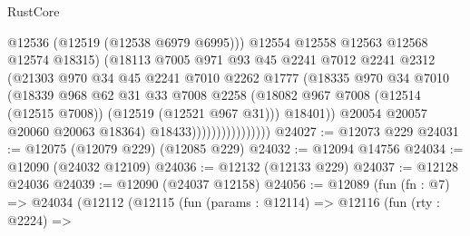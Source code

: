 \begin{lexlean}{RustCore}
\begin{coremodule}
                                      @12536
                                      (@12519 (@12538 @6979 @6995)))
                                    @12554
                                    @12558
                                    @12563
                                    @12568
                                    @12574
                                    @18315)
                                  (@18113
                                    @7005
                                    @971
                                    @93
                                    @45
                                    @2241
                                    @7012
                                    @2241
                                    @2312
                                    (@21303
                                      @970
                                      @34
                                      @45
                                      @2241
                                      @7010
                                      @2262
                                      @1777
                                      (@18335
                                        @970
                                        @34
                                        @7010
                                        (@18339
                                          @968
                                          @62
                                          @31
                                          @33
                                          @7008
                                          @2258
                                          (@18082
                                            @967
                                            @7008
                                            (@12514 (@12515 @7008))
                                            (@12519 (@12521 @967 @31)))
                                          @18401))
                                      @20054
                                      @20057
                                      @20060
                                      @20063
                                      @18364)
                                    @18433))))))))))))))))
@24027 := @12073 @229
@24031 := @12075 (@12079 @229) (@12085 @229)
@24032 := @12094 @14756
@24034 := @12090 (@24032 @12109)
@24036 := @12132 (@12133 @229)
@24037 := @12128 @24036
@24039 := @12090 (@24037 @12158)
@24056 := @12089
    (fun (fn : @7) =>
    @24034
      (@12112
        (@12115
          (fun (params : @12114) =>
          @12116
            (fun (rty : @2224) =>

\end{coremodule}
\end{lexlean}
